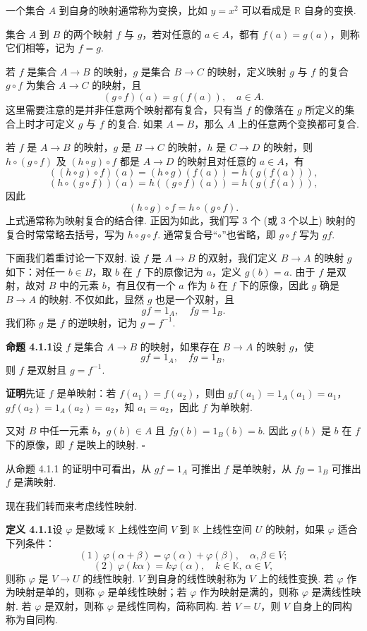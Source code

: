 \documentclass[UTF8, 12pt, fontset=fandol, oneside]{ctexart}
\begin{document}
一个集合 $A$ 到自身的映射通常称为变换，比如 $y=x^2$ 可以看成是 $\mathbb{R}$ 自身的变换.

集合 $A$ 到 $B$ 的两个映射 $f$ 与 $g$，若对任意的 $a\in A$，都有 $f(a)=g(a)$，则称它们相等，记为 $f=g$.

若 $f$ 是集合 $A\to B$ 的映射，$g$ 是集合 $B\to C$ 的映射，定义映射 $g$ 与 $f$ 的复合 $g\circ f$ 为集合 $A\to C$ 的映射，且
\[
(g\circ f)(a)=g(f(a)),\quad a\in A.
\]
这里需要注意的是并非任意两个映射都有复合，只有当 $f$ 的像落在 $g$ 所定义的集合上时才可定义 $g$ 与 $f$ 的复合. 如果 $A=B$，那么 $A$ 上的任意两个变换都可复合.

若 $f$ 是 $A\to B$ 的映射，$g$ 是 $B\to C$ 的映射，$h$ 是 $C\to D$ 的映射，则 $h\circ(g\circ f)$ 及 $(h\circ g)\circ f$ 都是 $A\to D$ 的映射且对任意的 $a\in A$，有
\[
((h\circ g)\circ f)(a)=(h\circ g)(f(a))=h(g(f(a))),
\]
\[
(h\circ(g\circ f))(a)=h((g\circ f)(a))=h(g(f(a))),
\]
因此
\begin{equation}
(h\circ g)\circ f=h\circ(g\circ f).
\tag{4.1.1}
\end{equation}
上式通常称为映射复合的结合律. 正因为如此，我们写 3 个 (或 3 个以上) 映射的复合时常常略去括号，写为 $h\circ g\circ f$. 通常复合号“$\circ$”也省略，即 $g\circ f$ 写为 $gf$.

下面我们着重讨论一下双射. 设 $f$ 是 $A\to B$ 的双射，我们定义 $B\to A$ 的映射 $g$ 如下：对任一 $b\in B$，取 $b$ 在 $f$ 下的原像记为 $a$，定义 $g(b)=a$. 由于 $f$ 是双射，故对 $B$ 中的元素 $b$，有且仅有一个 $a$ 作为 $b$ 在 $f$ 下的原像，因此 $g$ 确是 $B\to A$ 的映射. 不仅如此，显然 $g$ 也是一个双射，且
\[
gf=1_A,\quad fg=1_B.
\]
我们称 $g$ 是 $f$ 的逆映射，记为 $g=f^{-1}$.

\noindent\textbf{命题 4.1.1}\quad 设 $f$ 是集合 $A\to B$ 的映射，如果存在 $B\to A$ 的映射 $g$，使
\[
gf=1_A,\quad fg=1_B,
\]
则 $f$ 是双射且 $g=f^{-1}$.

\noindent\textbf{证明}\quad 先证 $f$ 是单映射：若 $f(a_1)=f(a_2)$，则由 $gf(a_1)=1_A(a_1)=a_1$，$gf(a_2)=1_A(a_2)=a_2$，知 $a_1=a_2$，因此 $f$ 为单映射.

又对 $B$ 中任一元素 $b$，$g(b)\in A$ 且 $fg(b)=1_B(b)=b$. 因此 $g(b)$ 是 $b$ 在 $f$ 下的原像，即 $f$ 是映上的映射. $\square$

从命题 4.1.1 的证明中可看出，从 $gf=1_A$ 可推出 $f$ 是单映射，从 $fg=1_B$ 可推出 $f$ 是满映射.

现在我们转而来考虑线性映射.

\noindent\textbf{定义 4.1.1}\quad 设 $\varphi$ 是数域 $\mathbb{K}$ 上线性空间 $V$ 到 $\mathbb{K}$ 上线性空间 $U$ 的映射，如果 $\varphi$ 适合下列条件：
\[
(1)\ \varphi(\alpha+\beta)=\varphi(\alpha)+\varphi(\beta),\quad \alpha,\beta\in V;
\]
\[
(2)\ \varphi(k\alpha)=k\varphi(\alpha),\quad k\in\mathbb{K},\ \alpha\in V,
\]
则称 $\varphi$ 是 $V\to U$ 的线性映射. $V$ 到自身的线性映射称为 $V$ 上的线性变换. 若 $\varphi$ 作为映射是单的，则称 $\varphi$ 是单线性映射；若 $\varphi$ 作为映射是满的，则称 $\varphi$ 是满线性映射. 若 $\varphi$ 是双射，则称 $\varphi$ 是线性同构，简称同构. 若 $V=U$，则 $V$ 自身上的同构称为自同构.
\end{document}
